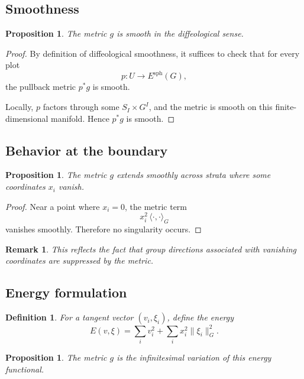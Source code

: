 \documentclass[11pt]{amsart}
\newtheorem{proposition}[theorem]{Proposition}
\newtheorem{definition}[theorem]{Definition}
\newtheorem{remark}[theorem]{Remark}
\begin{document}
\subsection{Smoothness}

\begin{proposition}
The metric $g$ is smooth in the diffeological sense.
\end{proposition}

\begin{proof}
By definition of diffeological smoothness, it suffices to check that for every plot
\[
p : U \to E^{\mathrm{sph}}(G),
\]
the pullback metric $p^*g$ is smooth.

Locally, $p$ factors through some $S_I \times G^I$, and the metric is smooth on this finite-dimensional manifold. Hence $p^*g$ is smooth.
\end{proof}

\subsection{Behavior at the boundary}

\begin{proposition}
The metric $g$ extends smoothly across strata where some coordinates $x_i$ vanish.
\end{proposition}

\begin{proof}
Near a point where $x_i=0$, the metric term
\[
x_i^2 \,\langle \cdot,\cdot \rangle_G
\]
vanishes smoothly. Therefore no singularity occurs.
\end{proof}

\begin{remark}
This reflects the fact that group directions associated with vanishing coordinates are suppressed by the metric.
\end{remark}

\subsection{Energy formulation}

\begin{definition}
For a tangent vector $(v_i,\xi_i)$, define the energy
\[
E(v,\xi)
=
\sum_i v_i^2
+
\sum_i x_i^2 \|\xi_i\|_G^2.
\]
\end{definition}

\begin{proposition}
The metric $g$ is the infinitesimal variation of this energy functional.
\end{proposition}
\end{document}
